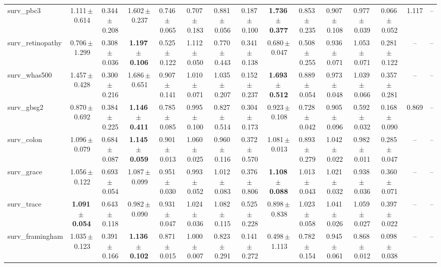 \documentclass[8pt]{extarticle}
\begin{document}
\begin{longtable}{l*{14}{c}}
surv\_pbc3 & 1.111\,$\pm$\,0.614 & 0.344\,$\pm$\,0.208 & 1.602\,$\pm$\,0.237 & 0.746\,$\pm$\,0.065 & 0.707\,$\pm$\,0.183 & 0.881\,$\pm$\,0.056 & 0.187\,$\pm$\,0.100 & \textbf{1.736\,$\pm$\,0.377} & 0.853\,$\pm$\,0.235 & 0.907\,$\pm$\,0.108 & 0.977\,$\pm$\,0.039 & 0.066\,$\pm$\,0.052 & 1.117 & -- \\
surv\_retinopathy & 0.706\,$\pm$\,1.299 & 0.308\,$\pm$\,0.036 & \textbf{1.197\,$\pm$\,0.106} & 0.525\,$\pm$\,0.122 & 1.112\,$\pm$\,0.050 & 0.770\,$\pm$\,0.443 & 0.341\,$\pm$\,0.138 & 0.680\,$\pm$\,0.047 & 0.508\,$\pm$\,0.255 & 0.936\,$\pm$\,0.071 & 1.053\,$\pm$\,0.071 & 0.281\,$\pm$\,0.122 & -- & -- \\
surv\_whas500 & 1.457\,$\pm$\,0.428 & 0.300\,$\pm$\,0.216 & 1.686\,$\pm$\,0.651 & 0.907\,$\pm$\,0.141 & 1.010\,$\pm$\,0.071 & 1.035\,$\pm$\,0.207 & 0.152\,$\pm$\,0.237 & \textbf{1.693\,$\pm$\,0.512} & 0.889\,$\pm$\,0.054 & 0.973\,$\pm$\,0.048 & 1.039\,$\pm$\,0.066 & 0.357\,$\pm$\,0.281 & -- & -- \\
surv\_gbsg2 & 0.870\,$\pm$\,0.692 & 0.384\,$\pm$\,0.225 & \textbf{1.146\,$\pm$\,0.411} & 0.785\,$\pm$\,0.085 & 0.995\,$\pm$\,0.100 & 0.827\,$\pm$\,0.514 & 0.304\,$\pm$\,0.173 & 0.923\,$\pm$\,0.108 & 0.728\,$\pm$\,0.042 & 0.905\,$\pm$\,0.096 & 0.592\,$\pm$\,0.032 & 0.168\,$\pm$\,0.090 & 0.869 & -- \\
surv\_colon & 1.096\,$\pm$\,0.079 & 0.684\,$\pm$\,0.087 & \textbf{1.145\,$\pm$\,0.059} & 0.901\,$\pm$\,0.013 & 1.060\,$\pm$\,0.025 & 0.960\,$\pm$\,0.116 & 0.372\,$\pm$\,0.570 & 1.081\,$\pm$\,0.013 & 0.893\,$\pm$\,0.279 & 1.042\,$\pm$\,0.022 & 0.982\,$\pm$\,0.011 & 0.285\,$\pm$\,0.047 & -- & -- \\
surv\_grace & 1.056\,$\pm$\,0.122 & 0.693\,$\pm$\,0.054 & 1.087\,$\pm$\,0.099 & 0.951\,$\pm$\,0.030 & 0.993\,$\pm$\,0.052 & 1.012\,$\pm$\,0.083 & 0.376\,$\pm$\,0.806 & \textbf{1.108\,$\pm$\,0.088} & 1.013\,$\pm$\,0.043 & 1.021\,$\pm$\,0.032 & 0.938\,$\pm$\,0.036 & 0.360\,$\pm$\,0.071 & -- & -- \\
surv\_trace & \textbf{1.091\,$\pm$\,0.054} & 0.643\,$\pm$\,0.118 & 0.982\,$\pm$\,0.090 & 0.931\,$\pm$\,0.047 & 1.024\,$\pm$\,0.036 & 1.082\,$\pm$\,0.115 & 0.525\,$\pm$\,0.228 & 0.898\,$\pm$\,0.838 & 1.023\,$\pm$\,0.058 & 1.041\,$\pm$\,0.026 & 1.059\,$\pm$\,0.027 & 0.397\,$\pm$\,0.022 & -- & -- \\
surv\_framingham & 1.035\,$\pm$\,0.123 & 0.391\,$\pm$\,0.166 & \textbf{1.136\,$\pm$\,0.102} & 0.871\,$\pm$\,0.015 & 1.000\,$\pm$\,0.007 & 0.823\,$\pm$\,0.291 & 0.141\,$\pm$\,0.272 & 0.498\,$\pm$\,1.113 & 0.782\,$\pm$\,0.154 & 0.945\,$\pm$\,0.061 & 0.868\,$\pm$\,0.012 & 0.098\,$\pm$\,0.038 & -- & -- \\

\end{longtable}
\end{document}
